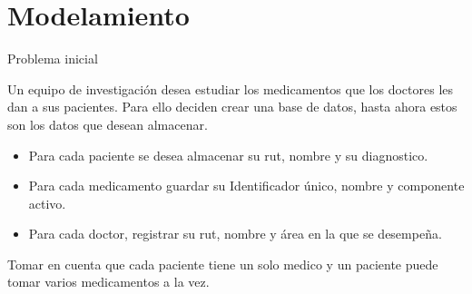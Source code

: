 \documentclass[11pt]{beamer}
\begin{document}





\section{Modelamiento}

\begin{frame}{Problema inicial}

Un equipo de investigación desea estudiar los medicamentos que los doctores les dan a sus pacientes. Para ello deciden crear una base de datos, hasta ahora estos son los datos que desean almacenar.

\begin{itemize}



\item Para cada paciente se desea almacenar su rut, nombre y su diagnostico.

\item Para cada medicamento guardar su Identificador único, nombre y componente activo.

\item Para cada doctor, registrar su rut, nombre y área en la que se desempeña.

\end{itemize}

Tomar en cuenta que cada paciente tiene un solo medico y un paciente puede tomar varios medicamentos a la vez.

\end{frame}
\end{document}
